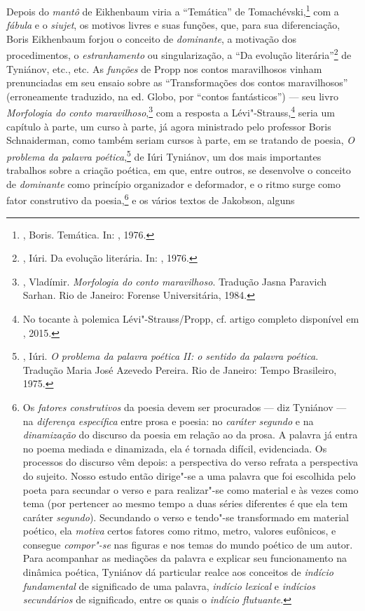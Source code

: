 Depois do \emph{mantô} de Eikhenbaum viria a ``Temática'' de
Tomachévski,\footnote{, Boris. Temática. In:
 , 1976.} com a \emph{fábula} e o \emph{siujet}, os motivos livres e
suas funções, que, para sua diferenciação, Boris Eikhenbaum forjou o conceito
de \emph{dominante}, a motivação dos procedimentos, o \emph{estranhamento} ou
singularização, a ``Da evolução literária''\footnote{, Iúri. Da evolução literária.
 In: , 1976.} de Tyniánov, etc., etc. As
\emph{funções} de Propp nos contos maravilhosos vinham prenunciadas
em seu ensaio sobre as ``Transformações dos contos maravilhosos''
(erroneamente traduzido, na ed. Globo, por ``contos fantásticos'') --- seu livro
\emph{Morfologia do conto maravilhoso},\footnote{, 
Vladímir. \emph{Morfologia do conto maravilhoso}. Tradução Jasna Paravich Sarhan. Rio de Janeiro:
 Forense Universitária, 1984.} com a resposta a
Lévi"-Strauss,\footnote{No tocante à polemica Lévi"-Strauss/Propp,
 cf. artigo completo disponível em , 2015.} seria um capítulo à parte, um curso à
parte, já agora ministrado pelo professor Boris Schnaiderman, como também seriam cursos
à parte, em se tratando de poesia, \emph{O problema da palavra poética},\footnote{, Iúri. 
\emph{O problema da palavra poética II: o sentido da palavra poética}.
 Tradução Maria José Azevedo Pereira. Rio de Janeiro: Tempo Brasileiro,
 1975.}
de Iúri Tyniánov, um dos mais importantes trabalhos sobre a
criação poética, em que, entre outros, se desenvolve o conceito de
\emph{dominante} como princípio organizador e deformador, e o ritmo surge como
fator construtivo da poesia,\footnote{Os \emph{fatores 
construtivos} da poesia devem ser procurados --- diz Tyniánov --- na 
\emph{diferença específica} entre prosa e poesia: no \emph{caráter 
segundo} e na \emph{dinamização} do discurso da poesia em relação ao 
da prosa. A palavra já entra no poema mediada e dinamizada, ela é 
tornada difícil, evidenciada. Os processos do discurso vêm depois:
 a perspectiva do verso refrata a perspectiva do sujeito. Nosso estudo 
então dirige"-se a uma palavra que foi escolhida pelo poeta para 
secundar o verso e para realizar"-se como material e às vezes como
 tema (por pertencer ao mesmo tempo a duas séries diferentes é que
 ela tem caráter \emph{segundo}). Secundando o verso e tendo"-se
transformado em material poético, ela \emph{motiva} certos fatores 
como ritmo, metro, valores eufônicos, e consegue \emph{compor"-se} 
nas figuras e nos temas do mundo poético de um autor. Para acompanhar
 as mediações da palavra e explicar seu funcionamento na dinâmica
 poética, Tyniánov dá particular realce aos conceitos de \emph{indício
 fundamental} de significado de uma palavra, \emph{indício lexical}
 e \emph{indícios secundários} de significado, entre os quais o
 \emph{indício flutuante}.} e os vários textos de Jakobson, alguns
